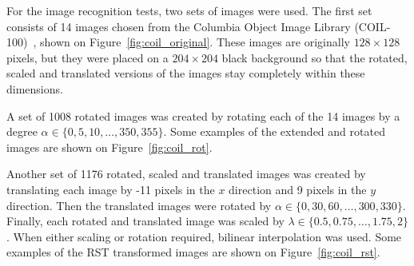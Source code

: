 For the image recognition tests, two sets of images were used. The first set consists of 14 images chosen from the Columbia Object Image Library (COIL-100)~\cite{coil}, shown on Figure~\ref{fig:coil_original}. These images are originally $128 \times 128$ pixels, but they were placed on a $204 \times 204$ black background so that the rotated, scaled and translated versions of the images stay completely within these dimensions. 

A set of 1008 rotated images was created by rotating each of the 14 images by a degree $\alpha\in\{0,5,10,\ldots,350,355\}$. Some examples of the extended and rotated images are shown on Figure~\ref{fig:coil_rot}.

Another set of 1176 rotated, scaled and translated images was created by translating each image by -11 pixels in the $x$ direction and 9 pixels in the $y$ direction. Then the translated images were rotated by $\alpha \in \{0,30,60,\ldots,300,330\}$. Finally, each rotated and translated image was scaled by $\lambda \in \{0.5, 0.75, \ldots, 1.75, 2\}$. When either scaling or rotation required, bilinear interpolation was used.
Some examples of the RST transformed images are shown on Figure~\ref{fig:coil_rst}.

